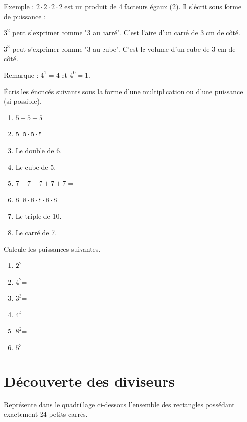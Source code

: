 \documentclass[../../syllabus_1.tex]{subfiles}
\begin{document}
Exemple : \(2 \cdot 2 \cdot 2 \cdot 2 \) est un produit de 4 facteurs égaux (2). Il s'écrit sous forme de puissance : 
\vspace{1cm}

$3^2$ peut s'exprimer comme "3 au carré". C'est l'aire d'un carré de 3 cm de côté.

$3^3$ peut s'exprimer comme "3 au cube". C'est le volume d'un cube de 3 cm de côté.

Remarque : $4^1 = 4$ et $4^0 = 1$.

\begin{exercise}
      Écris les énoncés suivants sous la forme d'une multiplication ou d'une puissance (si possible).
      \begin{enumerate} [cols=2, itemsep=1cm]
            \item \(5 + 5 + 5 = \)
            \item \(5 \cdot 5 \cdot 5 \cdot 5 \)
            \item Le double de 6.
            \item Le cube de 5.
            \item \(7 + 7 + 7 + 7 + 7 = \)
            \item \(8 \cdot 8 \cdot 8 \cdot 8 \cdot 8 \cdot 8 = \)
            \item Le triple de 10.
            \item Le carré de 7.
      \end{enumerate}
\end{exercise}

\begin{exercise}
      Calcule les puissances suivantes.
      \begin{enumerate} [cols=2, itemsep=1cm]
            \item $2^2$=
            \item $4^2$=
            \item $3^3$=
            \item $4^3$=
            \item $8^2$=
            \item $5^3$=
      \end{enumerate}
\end{exercise}

\section{Découverte des diviseurs}

Représente dans le quadrillage ci-dessous l'ensemble des rectangles possédant exactement 24 petits carrés.
\begin{center}
\end{center}
\end{document}
